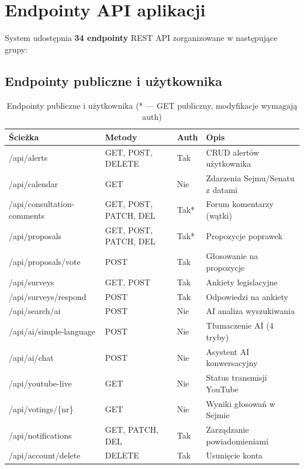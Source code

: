 \documentclass[12pt,a4paper]{article}
\begin{document}
\section{Endpointy API aplikacji}

System udostępnia \textbf{34 endpointy} REST API zorganizowane w następujące grupy:

\subsection{Endpointy publiczne i użytkownika}

\begin{table}[H]
\centering
\renewcommand{\arraystretch}{1.3}
\footnotesize
\begin{tabularx}{\textwidth}{l l l X}
\toprule
\textbf{Ścieżka} & \textbf{Metody} & \textbf{Auth} & \textbf{Opis} \\
\midrule
/api/alerts & GET, POST, DELETE & Tak & CRUD alertów użytkownika \\
/api/calendar & GET & Nie & Zdarzenia Sejmu/Senatu z datami \\
/api/consultation-comments & GET, POST, PATCH, DEL & Tak* & Forum komentarzy (wątki) \\
/api/proposals & GET, POST, PATCH, DEL & Tak* & Propozycje poprawek \\
/api/proposals/vote & POST & Tak & Głosowanie na propozycje \\
/api/surveys & GET, POST & Tak & Ankiety legislacyjne \\
/api/surveys/respond & POST & Tak & Odpowiedzi na ankiety \\
/api/search/ai & POST & Nie & AI analiza wyszukiwania \\
/api/ai/simple-language & POST & Nie & Tłumaczenie AI (4 tryby) \\
/api/ai/chat & POST & Nie & Asystent AI konwersacyjny \\
/api/youtube-live & GET & Nie & Status transmisji YouTube \\
/api/votings/\{nr\} & GET & Nie & Wyniki głosowań w Sejmie \\
/api/notifications & GET, PATCH, DEL & Tak & Zarządzanie powiadomieniami \\
/api/account/delete & DELETE & Tak & Usunięcie konta \\
\bottomrule
\end{tabularx}
\caption{Endpointy publiczne i użytkownika (* — GET publiczny, modyfikacje wymagają auth)}
\end{table}
\end{document}
